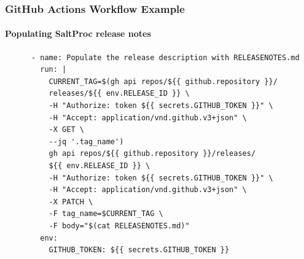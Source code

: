 \begin{frame}[fragile]
    \frametitle{GitHub Actions Workflow Example}
    \framesubtitle{Populating SaltProc release notes}

    \begin{verbatim}
      - name: Populate the release description with RELEASENOTES.md
        run: |
          CURRENT_TAG=$(gh api repos/${{ github.repository }}/
          releases/${{ env.RELEASE_ID }} \
          -H "Authorize: token ${{ secrets.GITHUB_TOKEN }}" \
          -H "Accept: application/vnd.github.v3+json" \
          -X GET \
          --jq '.tag_name')
          gh api repos/${{ github.repository }}/releases/
          ${{ env.RELEASE_ID }} \
          -H "Authorize: token ${{ secrets.GITHUB_TOKEN }}" \
          -H "Accept: application/vnd.github.v3+json" \
          -X PATCH \
          -F tag_name=$CURRENT_TAG \
          -F body="$(cat RELEASENOTES.md)"
        env:
          GITHUB_TOKEN: ${{ secrets.GITHUB_TOKEN }}        
    \end{verbatim}
\end{frame}



